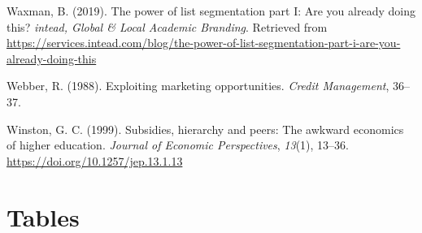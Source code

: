 \documentclass[
  12pt,
]{article}
\newlength{\cslhangindent}
\newlength{\cslentryspacingunit} %
\newenvironment{CSLReferences}[2] %
 {%
  \setlength{\parindent}{0pt}
  \ifodd #1
  \let\oldpar\par
  \def\par{\hangindent=\cslhangindent\oldpar}
  \fi
  \setlength{\parskip}{#2\cslentryspacingunit}
 }%
 {}
\begin{document}
\begin{CSLReferences}{1}{0}
\leavevmode{}%
Waxman, B. (2019). The power of list segmentation part {I}: Are you already doing this? \emph{intead, Global \& Local Academic Branding}. Retrieved from \url{https://services.intead.com/blog/the-power-of-list-segmentation-part-i-are-you-already-doing-this}

\leavevmode{}%
Webber, R. (1988). Exploiting marketing opportunities. \emph{Credit Management}, 36--37.

\leavevmode{}%
Winston, G. C. (1999). Subsidies, hierarchy and peers: The awkward economics of higher education. \emph{Journal of Economic Perspectives}, \emph{13}(1), 13--36. \url{https://doi.org/10.1257/jep.13.1.13}

\end{CSLReferences}

\newpage

\hypertarget{tables}{%
\section{Tables}\label{tables}}
\end{document}
